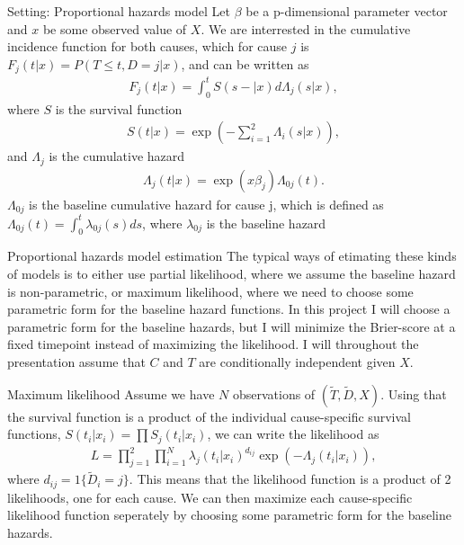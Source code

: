 \documentclass{beamer}\usepackage{listings}
\begin{document}
\begin{frame}[label={sec:orgbfbee36}]{Setting: Proportional hazards model}
Let \(\beta\) be a p-dimensional parameter vector and \(x\) be some observed value of \(X\). We are interrested in the cumulative incidence function for both causes, which for cause \(j\) is \(F_j(t|x) = P(T\leq t, D = j|x)\), and can be written as
\begin{align*}
F_j(t|x) = \int_0^t S(s-|x)d\Lambda_j(s|x),
\end{align*}
where \(S\) is the survival function
\begin{align*}
S(t|x) = \exp\left(-\sum_{i = 1}^2 \Lambda_i(s|x)\right),
\end{align*}
and \(\Lambda_j\) is the cumulative hazard
\begin{align*}
\Lambda_j(t|x) = \exp(x\beta_j)\Lambda_{0j}(t).
\end{align*}
\(\Lambda_{0j}\) is the baseline cumulative hazard for cause j, which is defined as \(\Lambda_{0j}(t) = \int_0^t \lambda_{0j}(s)ds\), where \(\lambda_{0j}\) is the baseline hazard
\end{frame}

\begin{frame}[label={sec:org9f663b4}]{Proportional hazards model estimation}
The typical ways of etimating these kinds of models is to either use partial likelihood, where we assume the baseline hazard is non-parametric, or maximum likelihood, where we need to choose some parametric form for the baseline hazard functions. \pause
\vfill
In this project I will choose a parametric form for the baseline hazards, but I will minimize the Brier-score at a fixed timepoint instead of maximizing the likelihood.\pause
\vfill
I will throughout the presentation assume that \(C\) and \(T\) are conditionally independent given \(X\).
\end{frame}

\begin{frame}[label={sec:orgfc1ea4b}]{Maximum likelihood}
Assume we have \(N\) observations of \((\tilde{T},\tilde{D}, X)\). Using that the survival function is a product of the individual cause-specific survival functions, \(S(t_i|x_i) = \prod S_j(t_i|x_i)\), we can write the likelihood as
\begin{align*}
L = \prod_{j = 1}^2\prod_{i = 1}^N\lambda_{j}(t_i|x_i)^{d_{ij}}\exp(-\Lambda_j(t_i|x_i)),
\end{align*}
where \(d_{ij} = 1\{\tilde{D}_i = j\}\). \pause This means that the likelihood function is a product of 2 likelihoods, one for each cause. We can then maximize each cause-specific likelihood function seperately by choosing some parametric form for the baseline hazards.
\end{frame}
\end{document}
